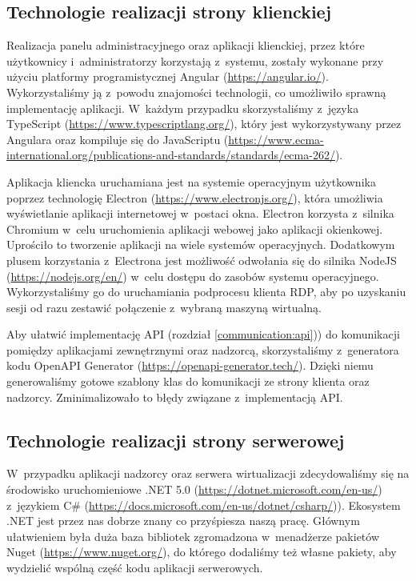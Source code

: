 \documentclass[../opis-rozwiazania.tex]{subfiles}
\begin{document}
\label{technologies}

\subsection{Technologie realizacji strony klienckiej}
Realizacja panelu administracyjnego oraz aplikacji klienckiej, przez które użytkownicy i~administratorzy korzystają z~systemu, zostały wykonane przy użyciu platformy programistycznej Angular (\url{https://angular.io/}).
Wykorzystaliśmy ją z~powodu znajomości technologii, co umożliwiło sprawną implementację aplikacji.
W~każdym przypadku skorzystaliśmy z~języka TypeScript (\url{https://www.typescriptlang.org/}), który jest wykorzystywany przez Angulara oraz kompiluje się do JavaScriptu (\url{https://www.ecma-international.org/publications-and-standards/standards/ecma-262/}).

Aplikacja kliencka uruchamiana jest na systemie operacyjnym użytkownika poprzez technologię Electron (\url{https://www.electronjs.org/}), która umożliwia wyświetlanie aplikacji internetowej w~postaci okna.
Electron korzysta z~silnika Chromium w~celu uruchomienia aplikacji webowej jako aplikacji okienkowej. Uprościło to tworzenie aplikacji na wiele systemów operacyjnych.
Dodatkowym plusem korzystania z~Electrona jest możliwość odwołania się do silnika NodeJS (\url{https://nodejs.org/en/}) w~celu dostępu do zasobów systemu operacyjnego.
Wykorzystaliśmy go do uruchamiania podprocesu klienta RDP, aby po uzyskaniu sesji od razu zestawić połączenie z~wybraną maszyną wirtualną.

Aby ułatwić implementację API (rozdział \ref{communication:api})) do komunikacji pomiędzy aplikacjami zewnętrznymi oraz nadzorcą, skorzystaliśmy z~generatora kodu OpenAPI Generator (\url{https://openapi-generator.tech/}).
Dzięki niemu generowaliśmy gotowe szablony klas do komunikacji ze strony klienta oraz nadzorcy.
Zminimalizowało to błędy związane z~implementacją API.

\subsection{Technologie realizacji strony serwerowej}
W~przypadku aplikacji nadzorcy oraz serwera wirtualizacji zdecydowaliśmy się na środowisko uruchomieniowe .NET 5.0 (\url{https://dotnet.microsoft.com/en-us/}) z~językiem C\# (\url{https://docs.microsoft.com/en-us/dotnet/csharp/})).
Ekosystem .NET jest przez nas dobrze znany co przyśpiesza naszą pracę.
Głównym ułatwieniem była duża baza bibliotek zgromadzona w~menadżerze pakietów Nuget (\url{https://www.nuget.org/}), do którego dodaliśmy też własne pakiety, aby wydzielić wspólną część kodu aplikacji serwerowych.
\end{document}
